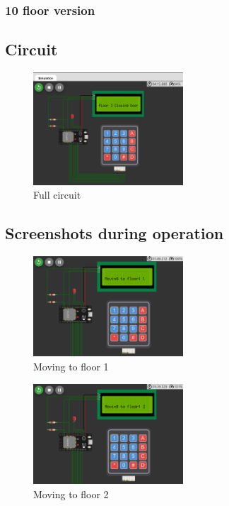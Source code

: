 \documentclass{article}
\begin{document}
\subsubsection{10 floor version}

\clearpage
\subsection{Circuit}
\begin{figure}[htbp] %
  \centering
  \includegraphics[width=0.5\textwidth]{img/circuit.png} %
  \caption{Full circuit}
\end{figure}
\subsection{Screenshots during operation}
\begin{figure}[htbp] %
  \centering
  \includegraphics[width=0.5\textwidth]{img/1_move.png} %
  \caption{Moving to floor 1}
\end{figure}

\begin{figure}[htbp] %
  \centering
  \includegraphics[width=0.5\textwidth]{img/2_move.png} %
  \caption{Moving to floor 2}
\end{figure}
\end{document}
